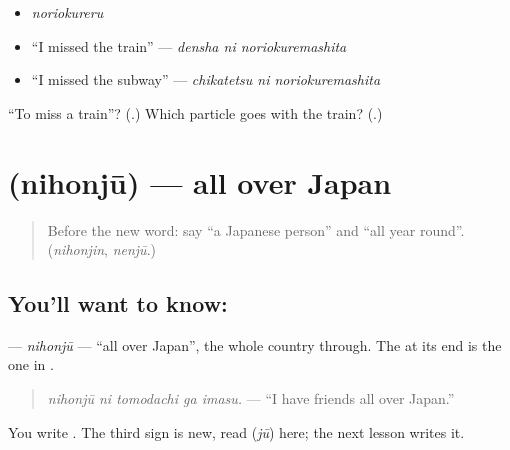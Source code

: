 \begin{itemize}
\raggedright
  \item \emph{noriokureru}
  \item \textquotedblleft{}I missed the train\textquotedblright{} — \emph{densha ni noriokuremashita}
  \item \textquotedblleft{}I missed the subway\textquotedblright{} — \emph{chikatetsu ni noriokuremashita}
\end{itemize}

\begin{tcolorbox}[breakable,colback=teal!4,colframe=teal!35!black,title={Before you move on}]
\textquotedblleft{}To miss a train\textquotedblright{}? (\textbf{}.) Which particle goes with the train? (\textbf{}.)
\end{tcolorbox}
\section[\texorpdfstring{\ja{日本中} (nihonjū)}{日本中 (nihonjū)}]{ (nihonjū) — all over Japan}

\label{lesson:JA-C257-nihonjuu}



\begin{quote}
Before the new word: say \textquotedblleft{}a Japanese person\textquotedblright{} and \textquotedblleft{}all year round\textquotedblright{}. (\emph{nihonjin}, \emph{nenjū}.)
\end{quote}

\subsection*{You'll want to know: }
\textbf{} — \emph{nihonjū} — \textquotedblleft{}all over Japan\textquotedblright{}, the whole country through. The \textbf{} at its end is the one in \textbf{}.

\begin{quote}
\textbf{  }
\end{quote}

\begin{quote}
\emph{nihonjū ni tomodachi ga imasu.} — \textquotedblleft{}I have friends all over Japan.\textquotedblright{}
\end{quote}

You write \textbf{}. The third sign is new, read \textbf{} (\emph{jū}) here; the next lesson writes it.

